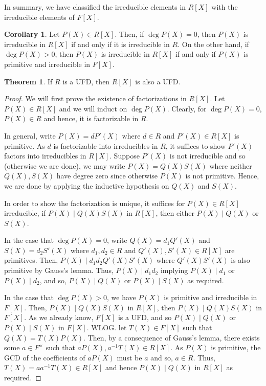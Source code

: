 \documentclass[]{article}
\theoremstyle{definition}
\newtheorem{theorem}{Theorem}
\newtheorem{corollary}{Corollary}[theorem]
\theoremstyle{definition}
\begin{document}
In summary, we have classified the irreducible elements in \(R[X]\) with 
the irreducible elements of \(F[X]\).

\begin{corollary}
  Let \(P(X) \in R[X]\). Then, if \(\deg P(X) = 0\), then \(P(X)\) is irreducible 
  in \(R[X]\) if and only if it is irreducible in \(R\). On the other hand, 
  if \(\deg P(X) > 0\), then \(P(X)\) is irreducible in \(R[X]\) if and only if 
  \(P(X)\) is primitive and irreducible in \(F[X]\).
\end{corollary}

\begin{theorem}
  If \(R\) is a UFD, then \(R[X]\) is also a UFD.
\end{theorem}
\begin{proof}
  We will first prove the existence of factorizations in \(R[X]\). Let 
  \(P(X) \in R[X]\) and we will induct on \(\deg P(X)\). Clearly, for 
  \(\deg P(X) = 0\), \(P(X) \in R\) and hence, it is factorizable in \(R\). 
  
  In general, write \(P(X) = d P'(X)\) where \(d \in R\) and \(P'(X) \in R[X]\) 
  is primitive. As \(d\) is factorizable into irreducibles in \(R\), 
  it suffices to show \(P'(X)\) factors into irreducibles in \(R[X]\).
  Suppose \(P'(X)\) is not irreducible and so (otherwise we are done), 
  we may write \(P(X) = Q(X)S(X)\) where neither \(Q(X), S(X)\) have degree 
  zero since otherwise \(P(X)\) is not primitive. Hence, we are done 
  by applying the inductive hypothesis on \(Q(X)\) and \(S(X)\).

  In order to show the factorization is unique, it suffices for \(P(X) \in R[X]\) 
  irreducible, if \(P(X) \mid Q(X)S(X)\) in \(R[X]\), then either 
  \(P(X) \mid Q(X)\) or \(S(X)\).

  In the case that \(\deg P(X) = 0\), write \(Q(X) = d_1 Q'(X)\) and 
  \(S(X) = d_2 S'(X)\) where \(d_1, d_2 \in R\) and \(Q'(X), S'(X) \in R[X]\) 
  are primitives. Then, \(P(X) \mid d_1 d_2 Q'(X) S'(X)\) where \(Q'(X)S'(X)\) 
  is also primitive by Gauss's lemma. Thus, \(P(X) \mid d_1 d_2\) implying 
  \(P(X) \mid d_1\) or \(P(X) \mid d_2\), and so, \(P(X) \mid Q(X)\) or 
  \(P(X) \mid S(X)\) as required.

  In the case that \(\deg P(X) > 0\), we have \(P(X)\) is primitive and 
  irreducible in \(F[X]\). Then, \(P(X) \mid Q(X)S(X)\) in \(R[X]\), then 
  \(P(X) \mid Q(X)S(X)\) in \(F[X]\). As we already know, \(F[X]\) is a UFD, 
  and so \(P(X) \mid Q(X)\) or \(P(X) \mid S(X)\) in \(F[X]\). WLOG. 
  let \(T(X) \in F[X]\) such that \(Q(X) = T(X)P(X)\). Then, by a consequence 
  of Gauss's lemma, there exists some \(a \in F^\times\) such that 
  \(aP(X), a^{-1}T(X) \in R[X]\). As \(P(X)\) is primitive, the GCD of 
  the coefficients of \(aP(X)\) must be \(a\) and so, \(a \in R\). Thus, 
  \(T(X) = aa^{-1}T(X) \in R[X]\) and hence \(P(X) \mid Q(X)\) in \(R[X]\) as 
  required.
\end{proof}
\end{document}
